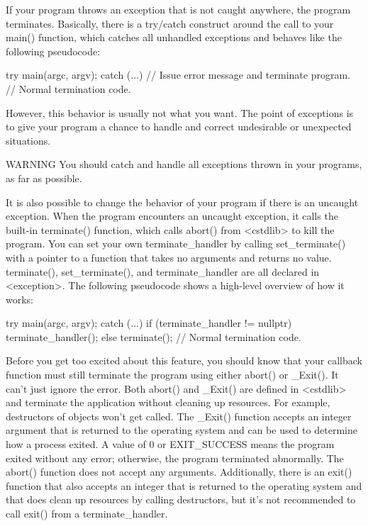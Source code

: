 
If your program throws an exception that is not caught anywhere, the program terminates. Basically, there is a try/catch construct around the call to your main() function, which catches all unhandled exceptions and behaves like the following pseudocode:

\begin{cpp}
try {
    main(argc, argv);
} catch (...) {
    // Issue error message and terminate program.
}
// Normal termination code.
\end{cpp}

However, this behavior is usually not what you want. The point of exceptions is to give your program a chance to handle and correct undesirable or unexpected situations.

\begin{myWarning}{WARNING}
You should catch and handle all exceptions thrown in your programs, as far as possible.
\end{myWarning}

It is also possible to change the behavior of your program if there is an uncaught exception. When the program encounters an uncaught exception, it calls the built-in terminate() function, which calls abort() from <cstdlib> to kill the program. You can set your own terminate\_handler by calling set\_terminate() with a pointer to a function that takes no arguments and returns no value. terminate(), set\_terminate(), and terminate\_handler are all declared in <exception>. The following pseudocode shows a high-level overview of how it works:

\begin{cpp}
try {
    main(argc, argv);
} catch (...) {
    if (terminate_handler != nullptr) {
        terminate_handler();
    } else {
        terminate();
    }
}
// Normal termination code.
\end{cpp}

Before you get too excited about this feature, you should know that your callback function must still terminate the program using either abort() or \_Exit(). It can’t just ignore the error. Both abort() and \_Exit() are defined in <cstdlib> and terminate the application without cleaning up resources. For example, destructors of objects won’t get called. The \_Exit() function accepts an integer argument that is returned to the operating system and can be used to determine how a process exited. A value of 0 or EXIT\_SUCCESS means the program exited without any error; otherwise, the program terminated abnormally. The abort() function does not accept any arguments. Additionally, there is an exit() function that also accepts an integer that is returned to the operating system and that does clean up resources by calling destructors, but it’s not recommended to call exit() from a terminate\_handler.

